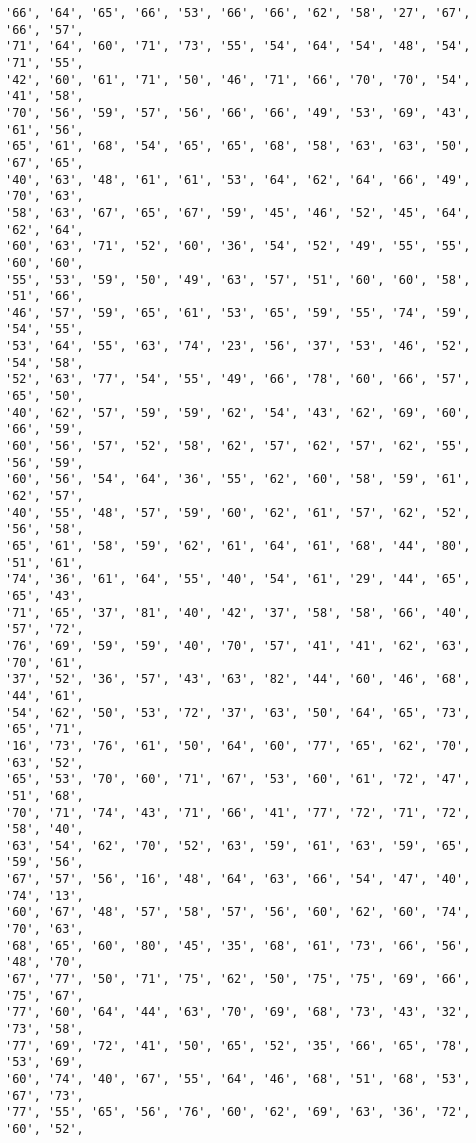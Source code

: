 \documentclass[11pt]{article}
\begin{document}
\begin{Verbatim}[commandchars=\\\{\}]
'66', '64', '65', '66', '53', '66', '66', '62', '58', '27', '67', '66', '57',
'71', '64', '60', '71', '73', '55', '54', '64', '54', '48', '54', '71', '55',
'42', '60', '61', '71', '50', '46', '71', '66', '70', '70', '54', '41', '58',
'70', '56', '59', '57', '56', '66', '66', '49', '53', '69', '43', '61', '56',
'65', '61', '68', '54', '65', '65', '68', '58', '63', '63', '50', '67', '65',
'40', '63', '48', '61', '61', '53', '64', '62', '64', '66', '49', '70', '63',
'58', '63', '67', '65', '67', '59', '45', '46', '52', '45', '64', '62', '64',
'60', '63', '71', '52', '60', '36', '54', '52', '49', '55', '55', '60', '60',
'55', '53', '59', '50', '49', '63', '57', '51', '60', '60', '58', '51', '66',
'46', '57', '59', '65', '61', '53', '65', '59', '55', '74', '59', '54', '55',
'53', '64', '55', '63', '74', '23', '56', '37', '53', '46', '52', '54', '58',
'52', '63', '77', '54', '55', '49', '66', '78', '60', '66', '57', '65', '50',
'40', '62', '57', '59', '59', '62', '54', '43', '62', '69', '60', '66', '59',
'60', '56', '57', '52', '58', '62', '57', '62', '57', '62', '55', '56', '59',
'60', '56', '54', '64', '36', '55', '62', '60', '58', '59', '61', '62', '57',
'40', '55', '48', '57', '59', '60', '62', '61', '57', '62', '52', '56', '58',
'65', '61', '58', '59', '62', '61', '64', '61', '68', '44', '80', '51', '61',
'74', '36', '61', '64', '55', '40', '54', '61', '29', '44', '65', '65', '43',
'71', '65', '37', '81', '40', '42', '37', '58', '58', '66', '40', '57', '72',
'76', '69', '59', '59', '40', '70', '57', '41', '41', '62', '63', '70', '61',
'37', '52', '36', '57', '43', '63', '82', '44', '60', '46', '68', '44', '61',
'54', '62', '50', '53', '72', '37', '63', '50', '64', '65', '73', '65', '71',
'16', '73', '76', '61', '50', '64', '60', '77', '65', '62', '70', '63', '52',
'65', '53', '70', '60', '71', '67', '53', '60', '61', '72', '47', '51', '68',
'70', '71', '74', '43', '71', '66', '41', '77', '72', '71', '72', '58', '40',
'63', '54', '62', '70', '52', '63', '59', '61', '63', '59', '65', '59', '56',
'67', '57', '56', '16', '48', '64', '63', '66', '54', '47', '40', '74', '13',
'60', '67', '48', '57', '58', '57', '56', '60', '62', '60', '74', '70', '63',
'68', '65', '60', '80', '45', '35', '68', '61', '73', '66', '56', '48', '70',
'67', '77', '50', '71', '75', '62', '50', '75', '75', '69', '66', '75', '67',
'77', '60', '64', '44', '63', '70', '69', '68', '73', '43', '32', '73', '58',
'77', '69', '72', '41', '50', '65', '52', '35', '66', '65', '78', '53', '69',
'60', '74', '40', '67', '55', '64', '46', '68', '51', '68', '53', '67', '73',
'77', '55', '65', '56', '76', '60', '62', '69', '63', '36', '72', '60', '52',

\end{Verbatim}
\end{document}
